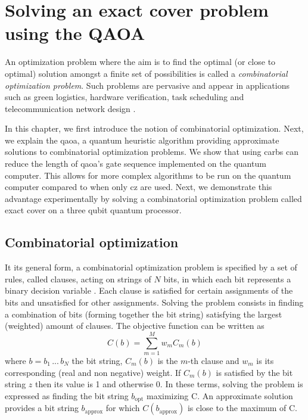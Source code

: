 \chapter{Solving an exact cover problem using the QAOA} \label{ch:qaoa}
An optimization problem where the aim is to find the optimal (or close to optimal) solution amongst a finite set of possibilities is called a \textit{combinatorial optimization problem}.  Such problems are pervasive and appear in applications such as green logistics, hardware verification, task scheduling and telecommunication network design \cite{Sbihi2007CombinatorialA, Coles2018QuantumBeginners, 2014ApplicationsOptimization}.

In this chapter, we first introduce the notion of combinatorial optimization. Next, we explain the \gls{qaoa}, a quantum heuristic algorithm providing approximate solutions to combinatorial optimization problems. We show that using \glspl{carb} can reduce the length of \gls{qaoa}'s gate sequence implemented on the quantum computer. This allows for more complex algorithms to be run on the quantum computer compared to when only \gls{cz} are used. Next, we demonstrate this advantage experimentally by solving a combinatorial optimization problem called exact cover on a three qubit quantum processor.

\section{Combinatorial optimization}
It its general form, a combinatorial optimization problem is specified by a set of rules, called clauses, acting on strings of $N$ bits, in which each bit represents a binary decision variable \cite{Farhi2014AAlgorithm}.  Each clause is satisfied for certain assignments of the bits and unsatisfied for other assignments. Solving the problem consists in finding a combination of bits (forming together the bit string) satisfying the largest (weighted) amount of clauses. The objective function can be written as 
\begin{equation}
    C(b) = \sum_{m=1}^M w_m C_m(b)
\end{equation}
where $b = b_1 \, ...\, b_N$ the bit string,  $C_m(b)$ is the $m$-th clause and $w_m$ is its corresponding (real and non negative) weight. If $C_m(b)$ is satisfied by the bit string $z$ then its value is 1 and otherwise 0. In these terms, solving the problem is expressed as finding the bit string $b_\text{opt}$ maximizing C. An approximate solution provides a bit string $b_{\text{approx}}$ for which  $C(b_{\text{approx}})$ is close to the maximum of C.

